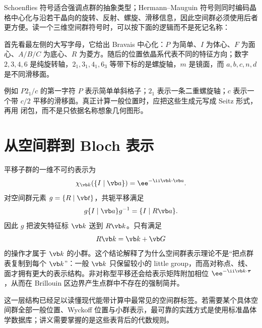 Schoenflies 符号适合强调点群的抽象类型；Hermann--Mauguin 符号则同时编码晶格中心化与沿若干晶向的旋转、反射、螺旋、滑移信息，因此空间群必须使用后者更方便。读一个三维空间群符号时，可以按下面的逻辑而不是死记名称：

首先看最左侧的大写字母，它给出 Bravais 中心化：$P$ 为简单、$I$ 为体心、$F$ 为面心、$A/B/C$ 为底心、$R$ 为菱方。随后的位置依晶系代表不同的特征方向；数字 $2,3,4,6$ 是纯旋转轴，$2_1,3_1,4_1,6_3$ 等带下标的是螺旋轴，$m$ 是镜面，而 $a,b,c,n,d$ 是不同滑移面。

例如 $P2_1/c$ 的第一字符 $P$ 表示简单单斜格子；$2_1$ 表示一条二重螺旋轴；$c$ 表示一个带 $c/2$ 平移的滑移面。真正计算一般位置时，应把这些生成元写成 Seitz 形式，再用  闭包，而不是只依据名称想象几何图形。

\section{从空间群到 Bloch 表示}

平移子群的一维不可约表示为
\[
\chi_{\vb k}(\{I\mid\vb a\})=\ee^{-\ii\vb k\cdot\vb a}.
\]
对空间群元素 $g=\{R\mid\vb t\}$，共轭平移满足
\[
g\{I\mid\vb a\}g^{-1}=\{I\mid R\vb a\}.
\]
因此 $g$ 把波矢特征标 $\vb k$ 送到 $R\vb k$。只有满足
\[
R\vb k=\vb k+\vb G
\]
的操作才属于 $\vb k$ 的小群。这个结论解释了为什么空间群表示理论不是“把点群表复制到每个 $\vb k$”：一般 $\vb k$ 只保留较小的 little group，而高对称点、线、面才拥有更大的表示结构。非对称型平移还会给表示矩阵附加相位 $\ee^{-\ii\vb k\cdot\boldsymbol\tau}$，从而在 Brillouin 区边界产生点群中不存在的强制简并。

这一层结构已经足以读懂现代能带计算中最常见的空间群标签。若需要某个具体空间群全部一般位置、Wyckoff 位置与小群表示，最可靠的实践方式是使用标准晶体学数据库；讲义需要掌握的是这些表背后的代数规则。
